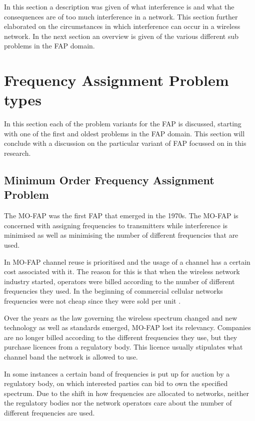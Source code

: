 In this section a description was given of what interference is and what the consequences are of too much interference in a network. This section further elaborated on the circumstances in which interference can occur in a wireless network. In the next section an overview is given of the various different sub problems in the \gls{FAP} domain.


\section{Frequency Assignment Problem types}
\label{sec:FAPVariants}
In this section each of the problem variants for the \gls{FAP} is discussed, starting with one of the first and oldest problems in the \gls{FAP} domain. This section will conclude with a discussion on the particular variant of \gls{FAP} focussed on in this research.
\subsection{Minimum Order Frequency Assignment Problem}
The \gls{MO-FAP} was the first \gls{FAP} that emerged in the 1970s. The \gls{MO-FAP} is concerned with assigning frequencies to transmitters while interference is minimised as well as minimising the number of different frequencies that are used\cite{Karen2004}. 

In \gls{MO-FAP} channel reuse is prioritised and the usage of a channel has a certain cost associated with it. The reason for this is that when the wireless network industry started, operators were billed according to the number of different frequencies they used. In the beginning of commercial cellular networks frequencies were not cheap since they were sold per unit \cite{MontemanniThesis}. 

Over the years as the law governing the wireless spectrum changed and new technology as well as standards emerged, \gls{MO-FAP} lost its relevancy\cite{Karen2004,MontemanniThesis}. Companies are no longer billed according to the different frequencies they use, but they purchase licences from a regulatory body\cite{Karen2004,MontemanniThesis}. This licence usually stipulates what channel band the network is allowed to use.

In some instances a certain band of frequencies is put up for auction by a regulatory body, on which interested parties can bid to own the specified spectrum\cite{Karen2004,MontemanniThesis}. Due to the shift in how frequencies are allocated to networks, neither the regulatory bodies nor the network operators care about the number of different frequencies are used\cite{Karen2004,MontemanniThesis}.
